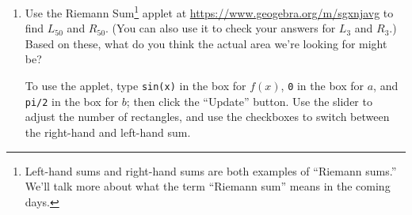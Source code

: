 \documentclass{article}
\begin{document}
\begin{enumerate}
\begin{enumerate}
    \begin{solution} %
      This time we are interested in $R_3$, which is an :


      \begin{align*}
        R_3 &= \sin \left( \frac{\pi}{6} \right) \cdot \frac{\pi}{6} +
        \sin \left( \frac{2 \pi}{6} \right) \cdot \frac{\pi}{6} + \sin
        \left( \frac{3 \pi}{6} \right) \cdot \frac{\pi}{6} \\
        &= \frac{1}{2} \cdot \frac{\pi}{6} + \frac{\sqrt{3}}{2} \cdot
        \frac{\pi}{6} + 1 \cdot \frac{\pi}{6} \\
        &= \boxed{\frac{\pi (3 + \sqrt{3})}{12}}
      \end{align*}
    \end{solution}

  \item
    \begin{problem}[\vfill]
      Use the Riemann Sum\footnote{Left-hand sums and right-hand sums are
        both examples of ``Riemann sums.''  We'll talk more about what the
        term ``Riemann sum'' means in the coming days.} applet at
      \url{https://www.geogebra.org/m/sgxnjavg} to find $L_{50}$ and
      $R_{50}$.  (You can also use it to check your answers for $L_3$ and
      $R_3$.)  Based on these, what do you think the actual area we're
      looking for might be?

      To use the applet, type \texttt{sin(x)} in the box for $f(x)$,
      \texttt{0} in the box for $a$, and \texttt{pi/2} in the box for $b$;
      then click the ``Update'' button.  Use the slider to adjust the
      number of rectangles, and use the checkboxes to switch between the
      right-hand and left-hand sum.
    \end{problem}


\end{enumerate}
\end{enumerate}
\end{document}
